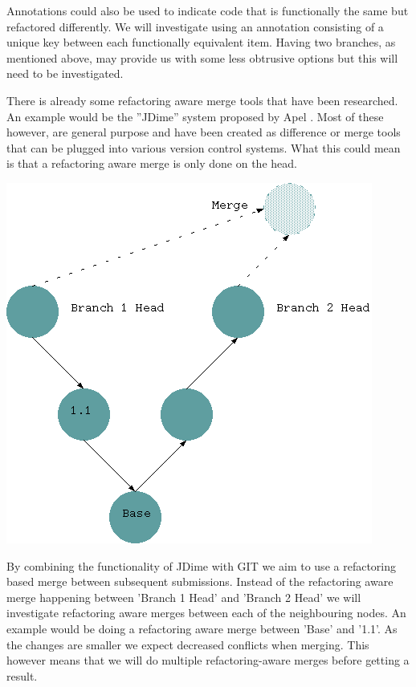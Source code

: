 \documentclass[12pt]{CRPITStyle}
\renewcommand{\cite}{\citep}
\begin{document}
Annotations could also be used to indicate code that is functionally the same but refactored differently. We will investigate using an annotation consisting of a unique key between each functionally equivalent item. Having two branches, as mentioned above, may provide us with some less obtrusive options but this will need to be investigated.

There is already some refactoring aware merge tools that have been researched. An example would be the ''JDime'' system proposed by Apel \cite{Apel2011}. Most of these however, are general purpose and have been created as difference or merge tools that can be plugged into various version control systems. What this could mean is that a refactoring aware merge is only done on the head.

\begin{center}
\includegraphics[scale=0.5]{git-diag2}
\end{center}

By combining the functionality of JDime with GIT we aim to use a refactoring based merge between subsequent submissions. Instead of the refactoring aware merge happening between 'Branch 1 Head' and 'Branch 2 Head' we will investigate refactoring aware merges between each of the neighbouring nodes. An example would be doing a refactoring aware merge between 'Base' and '1.1'. As the changes are smaller we expect decreased conflicts when merging. This however means that we will do multiple refactoring-aware merges before getting a result.
\end{document}
